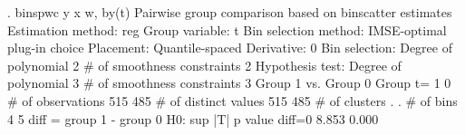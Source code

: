 . binspwc y x w, by(t)
{\smallskip}
Pairwise group comparison based on binscatter estimates
Estimation method: reg
Group variable: t
Bin selection method: IMSE-optimal plug-in choice
Placement: Quantile-spaced
Derivative: 0
Bin selection:                {\VBAR} 
         Degree of polynomial {\VBAR}       2
  \# of smoothness constraints {\VBAR}       2
Hypothesis test:              {\VBAR} 
         Degree of polynomial {\VBAR}       3
  \# of smoothness constraints {\VBAR}       3
{\smallskip}
Group 1 vs. Group 0
Group t=                      {\VBAR}      1   {\VBAR}     0
\# of observations             {\VBAR}     515  {\VBAR}     485
\# of distinct values          {\VBAR}     515  {\VBAR}     485
\# of clusters                 {\VBAR}       .  {\VBAR}       .
\# of bins                     {\VBAR}       4  {\VBAR}       5
{\smallskip}
diff = group 1 - group 0
H0:                {\VBAR} sup |T|           p value
diff=0             {\VBAR}   8.853             0.000
{\smallskip}
